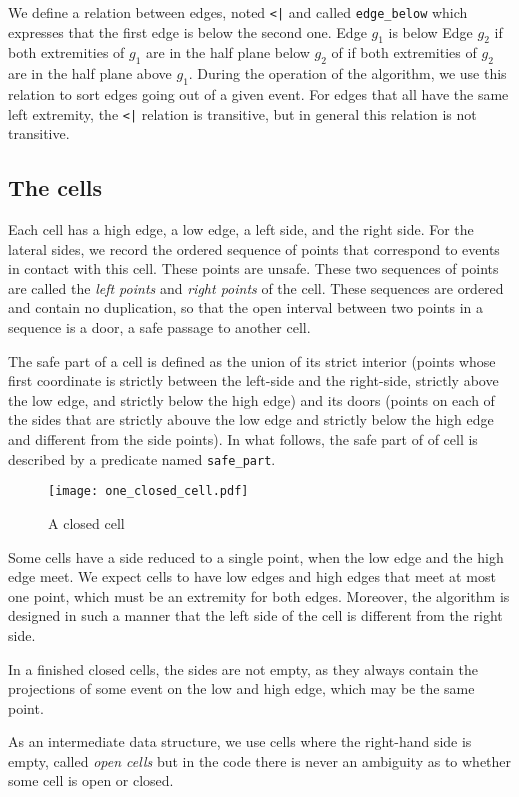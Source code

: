 \documentclass[a4paper, USenglish, cleveref, autoref, thm-restate]{lipics-v2021}
\begin{document}
We define a relation between edges, noted {\tt <|} and called
{\tt edge\_below} which expresses
that the first edge is below the second one.  Edge \(g_1\) is below Edge
\(g_2\) if both extremities of \(g_1\) are in the half plane below
\(g_2\) of if both extremities of \(g_2\) are in the half plane above
\(g_1\).  During the operation of the algorithm, we use this relation
to sort edges going out of a given event.  For edges that all have the
same left extremity, the {\tt <|} relation is transitive, but in
general this relation is not transitive.
\subsection{The cells}
Each cell has a high edge, a low edge, a left side, and the right side.  For
the lateral sides, we record the ordered sequence of points that
correspond  to events in contact with this cell.  These points are
unsafe.  These two sequences of points are called the {\em left
  points} and {\em right points} of the cell.  These sequences are
ordered and contain no duplication, so that the open interval between two
points in a sequence is a door, a safe passage to another cell.

The safe part of a cell is defined as the union of its strict interior
(points whose first coordinate is strictly between the left-side and
the right-side, strictly above the low edge, and strictly below the
high edge) and its doors (points on each of the sides that are
strictly abouve the low edge and strictly below the high edge and
different from the side points).  In what follows, the safe part of of cell
is described by a predicate named {\tt safe\_part}.

\begin{figure}
\texttt{[image: one\_closed\_cell.pdf]}
\caption{A closed cell}
\end{figure}

Some cells have a side reduced to a single point, when the low edge
and the high edge meet.  We expect cells to have low edges and high
edges that meet at most one point, which must be an extremity for both
edges.  Moreover, the algorithm is designed in such a manner that the
left side of the cell is different from the right side.

In a finished closed cells, the sides are not empty, as they always
contain the projections of some event on the low and high edge, which
may be the same point.

As an intermediate data structure, we use cells where the
right-hand side is empty, called {\em open cells}  but in the code
there is never an ambiguity as to whether some cell is open or closed.
\end{document}
